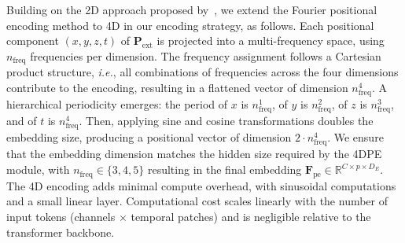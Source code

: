 \documentclass{article}
\begin{document}
Building on the 2D approach proposed by~\citet{defossez2023decoding}, we extend the Fourier positional encoding method to 4D in our encoding strategy, as follows. Each positional component $(x,y,z,t)$ of $\mathbf{P}_{\text{ext}}$ is projected into a multi-frequency space, using $n_{\text{freq}}$ frequencies per dimension. The frequency assignment follows a Cartesian product structure, \emph{i.e.}, all combinations of frequencies across the four dimensions contribute to the encoding, resulting in a flattened vector of dimension $n_{\text{freq}}^4$.
A hierarchical periodicity emerges: the period of $x$ is $n_{\text{freq}}^1$, of $y$ is $n_{\text{freq}}^2$, of $z$ is $n_{\text{freq}}^3$, and of $t$ is $n_{\text{freq}}^4$. Then, applying sine and cosine transformations doubles the embedding size, producing a positional vector of dimension $2\cdot n_{\text{freq}}^4$. We ensure that the  embedding dimension matches the hidden size required by the 4DPE module, with $n_{\text{freq}} \in \{3, 4, 5\}$ resulting in the final embedding $\mathbf{F}_{\text{pe}} \in \mathbb{R}^{C \times p \times D_E}$. The 4D encoding adds minimal compute overhead, with sinusoidal computations and a small linear layer. Computational cost scales linearly with the number of input tokens (channels $\times$ temporal patches) and is negligible relative to the transformer backbone.



\end{document}
